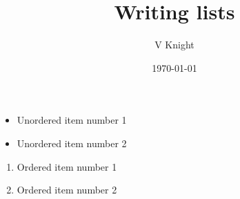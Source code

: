 \documentclass{article}
\title{Writing lists}
\author{V Knight}
\date{\today}
\begin{document}
\maketitle

\begin{itemize}
	\item Unordered item number 1
	\item Unordered item number 2
\end{itemize}

\begin{enumerate}
	\item Ordered item number 1
	\item Ordered item number 2
\end{enumerate}
\end{document}
